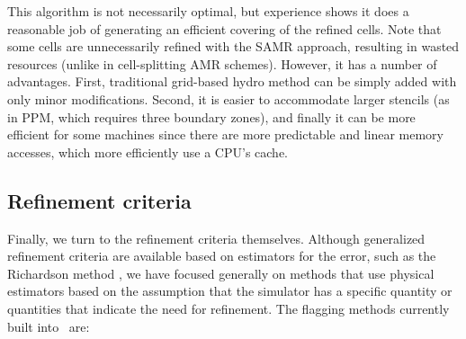 This algorithm is not necessarily optimal, but experience shows it does a reasonable job of generating an efficient covering of the refined cells.  Note that some cells are unnecessarily refined with the SAMR approach, resulting in wasted resources (unlike in cell-splitting AMR schemes).  However, it has a number of advantages.  First, traditional grid-based hydro method can be simply added with only minor modifications.  Second, it is easier to accommodate larger stencils (as in PPM, which requires three boundary zones), and finally it can be more efficient for some machines since there are more predictable and linear memory accesses, which more efficiently use a CPU's cache.


\subsection{Refinement criteria}
\label{sec:refinement_criteria}

Finally, we turn to the refinement criteria themselves.  Although generalized refinement criteria are available based on estimators for the error, such as the Richardson method , we have focused generally on methods that use physical estimators based on the assumption that the simulator has a specific quantity or quantities that indicate the need for refinement.  The flagging methods currently built into \enzo\ are:

